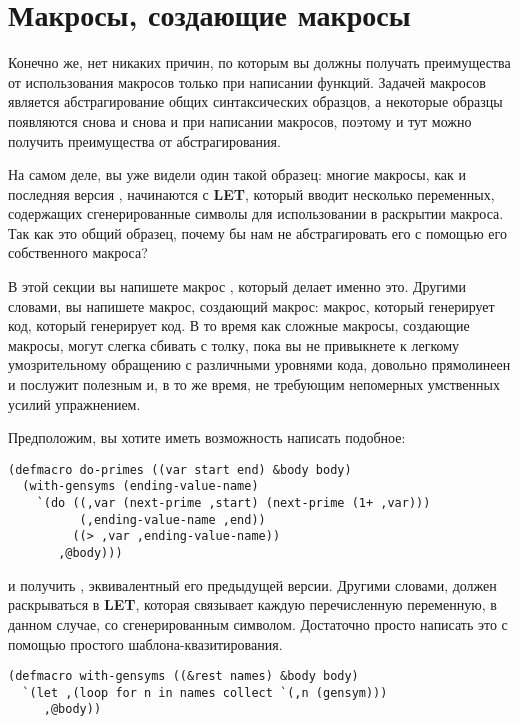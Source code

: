 \section{Макросы, создающие макросы}

Конечно же, нет никаких причин, по которым вы должны получать преимущества от
использования макросов только при написании функций. Задачей макросов является
абстрагирование общих синтаксических образцов, а некоторые образцы появляются снова и
снова и при написании макросов, поэтому и тут можно получить преимущества от
абстрагирования.

На самом деле, вы уже видели один такой образец: многие макросы, как и последняя версия
, начинаются с \textbf{LET}, который вводит несколько переменных,
содержащих сгенерированные символы для использовании в раскрытии макроса. Так как это
общий образец, почему бы нам не абстрагировать его с помощью его собственного макроса?

В этой секции вы напишете макрос , который делает именно это. Другими
словами, вы напишете макрос, создающий макрос: макрос, который генерирует код, который
генерирует код. В то время как сложные макросы, создающие макросы, могут слегка сбивать с
толку, пока вы не привыкнете к легкому умозрительному обращению с различными уровнями
кода,  довольно прямолинеен и послужит полезным и, в то же время, не
требующим непомерных умственных усилий упражнением.

Предположим, вы хотите иметь возможность написать подобное:

\begin{lstlisting}
(defmacro do-primes ((var start end) &body body)
  (with-gensyms (ending-value-name)
    `(do ((,var (next-prime ,start) (next-prime (1+ ,var)))
          (,ending-value-name ,end))
         ((> ,var ,ending-value-name))
       ,@body)))
\end{lstlisting}

и получить , эквивалентный его предыдущей версии. Другими словами,
 должен раскрываться в \textbf{LET}, которая связывает каждую
перечисленную переменную,  в данном случае, со сгенерированным
символом. Достаточно просто написать это с помощью простого шаблона-квазитирования.

\begin{lstlisting}
(defmacro with-gensyms ((&rest names) &body body)
  `(let ,(loop for n in names collect `(,n (gensym)))
     ,@body))
\end{lstlisting}

